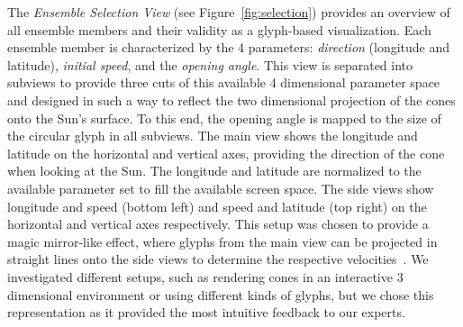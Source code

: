 \documentclass[journal]{vgtc}                %
\begin{document}
%

The \emph{Ensemble Selection View} (see Figure~\ref{fig:selection}) provides an overview of all ensemble members and their validity as a glyph-based visualization. Each ensemble member is characterized by the 4 parameters: \emph{direction} (longitude and latitude), \emph{initial speed}, and the \emph{opening angle}. This view is separated into subviews to provide three cuts of this available 4 dimensional parameter space and designed in such a way to reflect the two dimensional projection of the cones onto the Sun's surface. To this end, the opening angle is mapped to the size of the circular glyph in all subviews. The main view shows the longitude and latitude on the horizontal and vertical axes, providing the direction of the cone when looking at the Sun. The longitude and latitude are normalized to the available parameter set to fill the available screen space. The side views show longitude and speed (bottom left) and speed and latitude (top right) on the horizontal and vertical axes respectively. This setup was chosen to provide a magic mirror-like effect, where glyphs from the main view can be projected in straight lines onto the side views to determine the respective velocities~\cite{konig1999multiple}. We investigated different setups, such as rendering cones in an interactive 3 dimensional environment or using different kinds of glyphs, but we chose this representation as it provided the most intuitive feedback to our experts.
\end{document}
